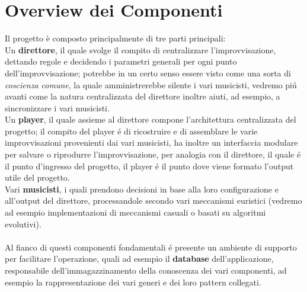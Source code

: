 \section{Overview dei Componenti}
Il progetto \`e composto principalmente di tre parti principali:\\
Un \textbf{direttore}, il quale svolge il compito di centralizzare l'improvvisazione,
dettando regole e decidendo i parametri generali per ogni punto dell'improvvisazione;
potrebbe in un certo senso essere visto come una sorta di \emph{coscienza comune},
la quale amministrerebbe silente i vari musicisti, vedremo pi\'u avanti come
la natura centralizzata del direttore inoltre aiuti, ad esempio, a sincronizzare
i vari musicisti.\\
Un \textbf{player}, il quale assieme al direttore compone l'architettura centralizzata
del progetto; il compito del player \'e di ricostruire e di assemblare le varie
improvvisazioni provenienti dai vari musicisti, ha inoltre un interfaccia
modulare per salvare o riprodurre l'improvvisazione, per analogia con il direttore,
il quale \'e il punto d'ingresso del progetto, il player \'e il punto dove viene
formato l'output utile del progetto.\\
Vari \textbf{musicisti}, i quali prendono decisioni in base alla loro configurazione
e all'output del direttore, processandole secondo vari meccanismi euristici
(vedremo ad esempio implementazioni di meccanismi casuali o basati su algoritmi evolutivi).\\
\\
Al fianco di questi componenti fondamentali \'e presente un ambiente di supporto
per facilitare l'operazione, quali ad esempio il \textbf{database} dell'applicazione,
responsabile dell'immagazzinamento della conoscenza dei vari componenti, ad
esempio la rappresentazione dei vari generi e dei loro pattern collegati.
